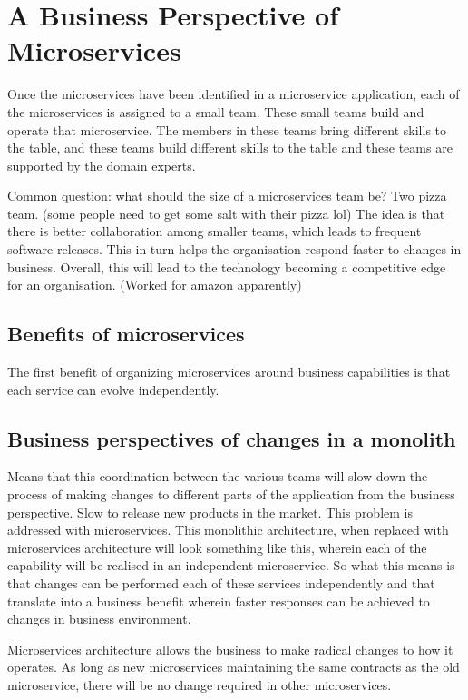 \documentclass[a4paper, 11pt]{book}
\begin{document}
    \section{A Business Perspective of Microservices}

    Once the microservices have been identified in a microservice application, each of the microservices is assigned to a small team.
    These small teams build and operate that microservice.
    The members in these teams bring different skills to the table, and these teams build different skills to the table and these teams are supported by the domain experts.

    Common question: what should the size of a microservices team be? Two pizza team. (some people need to get some salt with their pizza lol)
    The idea is that there is better collaboration among smaller teams, which leads to frequent software releases.
    This in turn helps the organisation respond faster to changes in business.
    Overall, this will lead to the technology becoming a competitive edge for an organisation. (Worked for amazon apparently)

    \subsection{Benefits of microservices}
    The first benefit of organizing microservices around business capabilities is that each service can evolve independently.

    \subsection{Business perspectives of changes in a monolith}
    Means that this coordination between the various teams will slow down the process of making changes to different parts of the application from the business perspective.
    Slow to release new products in the market.
    This problem is addressed with microservices.
    This monolithic architecture, when replaced with microservices architecture will look something like this, wherein each of the capability will be realised in an independent microservice.
    So what this means is that changes can be performed each of these services independently and that translate into a business benefit wherein faster responses can be achieved to changes in business environment.

    Microservices architecture allows the business to make radical changes to how it operates.
    As long as new microservices maintaining the same contracts as the old microservice, there will be no change required in other microservices.
\end{document}
